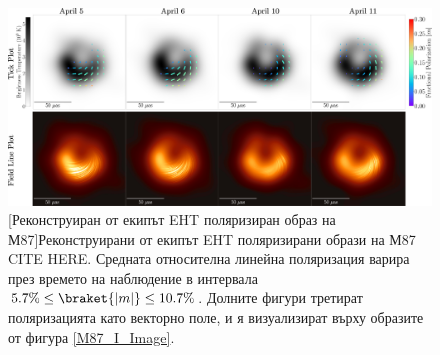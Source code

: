  \begin{figure}[h!]{
 \centering
 \includegraphics[scale = 0.7]{M87_Polarization_overlay.jpg}\newline
 [Реконструиран от екипът EHT поляризиран образ на М87]{\small Реконструирани от екипът EHT поляризирани образи на М87 CITE HERE. Средната относителна линейна поляризация варира през времето на наблюдение в интервала $5.7\% \le \braket{|m|} \le 10.7\%$. Долните фигури третират поляризацията като векторно поле, и я визуализират върху образите от фигура \ref{M87_I_Image}.} 
 \label{M87_Pol_Image}}
 \end{figure}
 \setlength{\footskip}{20pt}
 
